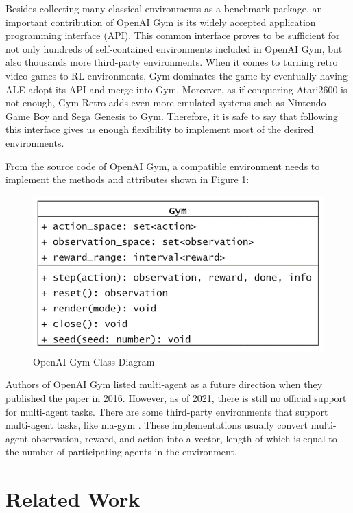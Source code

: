 \documentclass[fyp]{socreport}
\begin{document}
Besides collecting many classical environments as a benchmark package, an important contribution of OpenAI Gym is its widely accepted application programming interface (API). This common interface proves to be sufficient for not only hundreds of self-contained environments included in OpenAI Gym, but also thousands more third-party environments. When it comes to turning retro video games to RL environments, Gym dominates the game by eventually having ALE adopt its API and merge into Gym. Moreover, as if conquering Atari2600 is not enough, Gym Retro \cite{gym-retro} adds even more emulated systems such as Nintendo Game Boy and Sega Genesis to Gym. Therefore, it is safe to say that following this interface gives us enough flexibility to implement most of the desired environments.

From the source code of OpenAI Gym, a compatible environment needs to implement the methods and attributes shown in Figure \ref{fig:gym-class}:

\begin{figure}[htp]
    \centering
    \includegraphics{images/gym-class.png}
    \caption{OpenAI Gym Class Diagram}
    \label{fig:gym-class}
\end{figure}

Authors of OpenAI Gym listed multi-agent as a future direction when they published the paper in 2016. However, as of 2021, there is still no official support for multi-agent tasks. There are some third-party environments that support multi-agent tasks, like ma-gym \cite{magym}. These implementations usually convert multi-agent observation, reward, and action into a vector, length of which is equal to the number of participating agents in the environment.

\section{Related Work}
\end{document}
